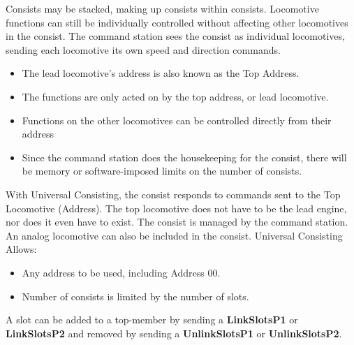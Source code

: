 Consists may be stacked, making up consists within consists. Locomotive functions can still be individually controlled without affecting other locomotives in the consist. The command station sees the consist as individual locomotives, sending each locomotive its own speed and direction commands.

\begin{itemize}
\item    The lead locomotive's address is also known as the Top Address.
\item    The functions are only acted on by the top address, or lead locomotive.
\item    Functions on the other locomotives can be controlled directly from their address
\item    Since the command station does the housekeeping for the consist, there will be memory or software-imposed limits on the number of consists.
\end{itemize}

With Universal Consisting, the consist responds to commands sent to the Top Locomotive (Address). The top locomotive does not have to be the lead engine, nor does it even have to exist. The consist is managed by the command station. An analog locomotive can also be included in the consist. Universal Consisting Allows:

\begin{itemize}
\item    Any address to be used, including Address 00.
\item    Number of consists is limited by the number of slots.
\end{itemize}

A slot can be added to a top-member by sending a \textbf{LinkSlotsP1} or \textbf{LinkSlotsP2} and removed by sending a \textbf{UnlinkSlotsP1} or \textbf{UnlinkSlotsP2}.

